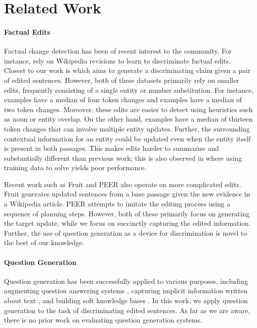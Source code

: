 \section{Related Work}

\paragraph{Factual Edits}
Factual change detection has been of recent interest to the community. For instance, \wikiatomicedits{} \citep{faruqui-etal-2018-wikiatomicedits} rely on Wikipedia revisions to learn to discriminate factual edits. Closest to our work is \vitaminc{} \citep{schuster-etal-2021-get} which aims to generate a discriminating claim given a pair of edited sentences. However, both of these datasets primarily rely on smaller edits, frequently consisting of a single entity or number substitution. For instance, \vitaminc{} examples have a median of four token changes and \wikiatomicedits{} examples have a median of two token changes. Moreover, these edits are easier to detect using heuristics such as  noun or entity overlap. On the other hand, \dataset{} examples have a median of thirteen token changes that can involve  multiple entity updates. Further, the surrounding contextual information for an entity could be updated even when the entity itself is present in both passages. This makes \dataset{} edits harder to summarize and substantially different than previous work; this is also observed in  where using \vitaminc{} training data to solve \dataset{} yields poor performance.

Recent work such as Fruit \citep{iv-etal-2022-fruit} and PEER \citep{schick2022peer} also operate on more complicated edits. Fruit generates updated sentences from a base passage given the new evidence in a Wikipedia article. PEER attempts to imitate the editing process using a sequence of planning steps. However, both of these primarily focus on generating the target update, while we focus on succinctly capturing the edited information. Further, the use of question generation as a device for discrimination is novel to the best of our knowledge.

\paragraph{Question Generation}
Question generation has been successfully applied to various purposes, including augmenting question answering systems \citep{duan-etal-2017-question, lewis-etal-2021-paq}, capturing implicit information written about text \citep{pyatkin-etal-2021-asking}, and building soft knowledge bases
 \citep{chen-etal-2022-qamat}. In this work, we apply question generation to the task of discriminating edited sentences. As far as we are aware, there is no prior work on evaluating question generation systems. 
